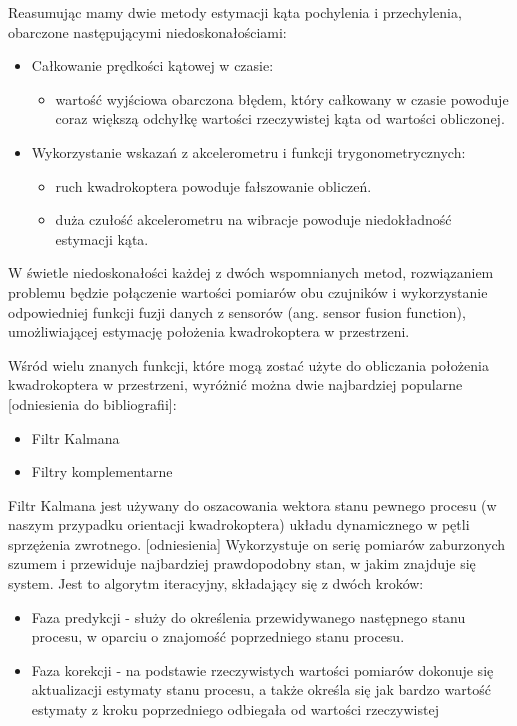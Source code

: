 Reasumując mamy dwie metody estymacji kąta pochylenia i przechylenia, obarczone następującymi niedoskonałościami:

\begin{itemize}
	\item Całkowanie prędkości kątowej w czasie:
		\begin{itemize}
			\item wartość wyjściowa obarczona błędem, który całkowany w czasie powoduje coraz większą odchyłkę wartości rzeczywistej kąta od wartości obliczonej.
		\end{itemize}
	\item Wykorzystanie wskazań z akcelerometru i funkcji trygonometrycznych:
		\begin{itemize}
			\item ruch kwadrokoptera powoduje fałszowanie obliczeń.
			\item duża czułość akcelerometru na wibracje powoduje niedokładność estymacji kąta.
		\end{itemize}
\end{itemize}

W świetle niedoskonałości każdej z dwóch wspomnianych metod, rozwiązaniem problemu będzie połączenie wartości pomiarów obu czujników i wykorzystanie odpowiedniej funkcji fuzji danych z sensorów (ang. sensor fusion function), umożliwiającej estymację położenia kwadrokoptera w przestrzeni.

Wśród wielu znanych funkcji, które mogą zostać użyte do obliczania położenia kwadrokoptera w przestrzeni, wyróżnić można dwie najbardziej popularne [odniesienia do bibliografii]:
\begin{itemize}
	\item Filtr Kalmana
	\item Filtry komplementarne
\end{itemize}

Filtr Kalmana jest używany do oszacowania wektora stanu pewnego procesu (w naszym przypadku orientacji kwadrokoptera) układu dynamicznego w pętli sprzężenia zwrotnego. [odniesienia] Wykorzystuje on serię pomiarów zaburzonych szumem i przewiduje najbardziej prawdopodobny stan, w jakim znajduje się system. Jest to algorytm iteracyjny, składający się z dwóch kroków:

\begin{itemize}
	\item Faza predykcji - służy do określenia przewidywanego następnego stanu procesu, w oparciu o znajomość poprzedniego stanu procesu.
	\item Faza korekcji - na podstawie rzeczywistych wartości pomiarów dokonuje się aktualizacji estymaty stanu procesu, a także określa się jak bardzo wartość estymaty z kroku poprzedniego odbiegała od wartości rzeczywistej
\end{itemize} 

